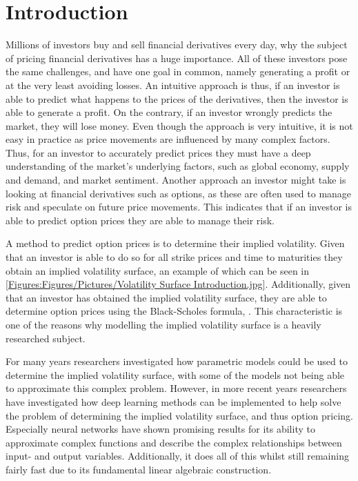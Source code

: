 \chapter{Introduction}\label{Ch.Introduction}
Millions of investors buy and sell financial derivatives every day, why the subject of pricing financial derivatives has a huge importance. All of these investors pose the same challenges, and have one goal in common, namely generating a profit or at the very least avoiding losses. An intuitive approach is thus, if an investor is able to predict what happens to the prices of the derivatives, then the investor is able to generate a profit. On the contrary, if an investor wrongly predicts the market, they will lose money. Even though the approach is very intuitive, it is not easy in practice as price movements are influenced by many complex factors. Thus, for an investor to accurately predict prices they must have a deep understanding of the market's underlying factors, such as global economy, supply and demand, and market sentiment. Another approach an investor might take is looking at financial derivatives such as options, as these are often used to manage risk and speculate on future price movements. This indicates that if an investor is able to predict option prices they are able to manage their risk.

A method to predict option prices is to determine their implied volatility. Given that an investor is able to do so for all strike prices and time to maturities they obtain an implied volatility surface, an example of which can be seen in \autoref{Figures:Figures/Pictures/Volatility Surface Introduction.jpg}. Additionally, given that an investor has obtained the implied volatility surface, they are able to determine option prices using the Black-Scholes formula, \citep{BS}. This characteristic is one of the reasons why modelling the implied volatility surface is a heavily researched subject.


For many years researchers investigated how parametric models could be used to determine the implied volatility surface, with some of the models not being able to approximate this complex problem. However, in more recent years researchers have investigated how deep learning methods can be implemented to help solve the problem of determining the implied volatility surface, and thus option pricing. Especially neural networks have shown promising results for its ability to approximate complex functions and describe the complex relationships between input- and output variables. Additionally, it does all of this whilst still remaining fairly fast due to its fundamental linear algebraic construction. 

